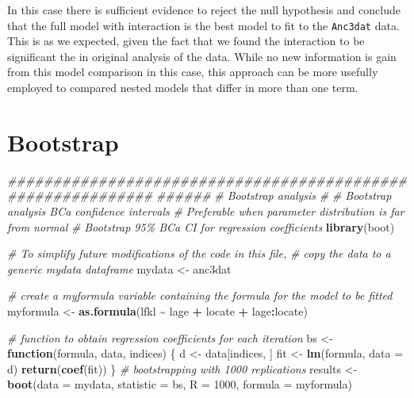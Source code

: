 \documentclass[
  12pt,
]{book}
\newenvironment{Shaded}{\begin{snugshade}}{\end{snugshade}}
\newcommand{\CommentTok}[1]{\textcolor[rgb]{0.56,0.35,0.01}{\textit{#1}}}
\newcommand{\ControlFlowTok}[1]{\textcolor[rgb]{0.13,0.29,0.53}{\textbf{#1}}}
\newcommand{\DataTypeTok}[1]{\textcolor[rgb]{0.13,0.29,0.53}{#1}}
\newcommand{\DecValTok}[1]{\textcolor[rgb]{0.00,0.00,0.81}{#1}}
\newcommand{\KeywordTok}[1]{\textcolor[rgb]{0.13,0.29,0.53}{\textbf{#1}}}
\newcommand{\NormalTok}[1]{#1}
\newcommand{\OperatorTok}[1]{\textcolor[rgb]{0.81,0.36,0.00}{\textbf{#1}}}
\newcommand{\StringTok}[1]{\textcolor[rgb]{0.31,0.60,0.02}{#1}}
\begin{document}
In this case there is sufficient evidence to reject the null hypothesis and conclude that the full model with interaction is the best model to fit to the \texttt{Anc3dat} data. This is as we expected, given the fact that we found the interaction to be significant the in original analysis of the data. While no new information is gain from this model comparison in this case, this approach can be more usefully employed to compared nested models that differ in more than one term.

\hypertarget{bootstrap-1}{%
\section{Bootstrap}\label{bootstrap-1}}

\begin{Shaded}
\begin{Highlighting}[]
\CommentTok{\#\#\#\#\#\#\#\#\#\#\#\#\#\#\#\#\#\#\#\#\#\#\#\#\#\#\#\#\#\#\#\#\#\#\#\#\#\#\#\#\#\#\#\#\#\#\#\#\#\#\#\#\#\#\#\#\#\#\#\#}
\CommentTok{\#\#\#\#\#\#}
\CommentTok{\# Bootstrap analysis}
\CommentTok{\#}
\CommentTok{\# Bootstrap analysis BCa confidence intervals}
\CommentTok{\# Preferable when parameter distribution is far from normal}
\CommentTok{\# Bootstrap 95\% BCa CI for regression coefficients}
\KeywordTok{library}\NormalTok{(boot)}

\CommentTok{\# To simplify future modifications of the code in this file,}
\CommentTok{\# copy the data to a generic mydata dataframe}
\NormalTok{mydata \textless{}{-}}\StringTok{ }\NormalTok{anc3dat}

\CommentTok{\# create a myformula variable containing the formula for the model to be fitted}
\NormalTok{myformula \textless{}{-}}\StringTok{ }\KeywordTok{as.formula}\NormalTok{(lfkl }\OperatorTok{\textasciitilde{}}\StringTok{ }\NormalTok{lage }\OperatorTok{+}\StringTok{ }\NormalTok{locate }\OperatorTok{+}\StringTok{ }\NormalTok{lage}\OperatorTok{:}\NormalTok{locate)}

\CommentTok{\# function to obtain regression coefficients for each iteration}
\NormalTok{bs \textless{}{-}}\StringTok{ }\ControlFlowTok{function}\NormalTok{(formula, data, indices) \{}
\NormalTok{  d \textless{}{-}}\StringTok{ }\NormalTok{data[indices, ]}
\NormalTok{  fit \textless{}{-}}\StringTok{ }\KeywordTok{lm}\NormalTok{(formula, }\DataTypeTok{data =}\NormalTok{ d)}
  \KeywordTok{return}\NormalTok{(}\KeywordTok{coef}\NormalTok{(fit))}
\NormalTok{\}}
\CommentTok{\# bootstrapping with 1000 replications}
\NormalTok{results \textless{}{-}}\StringTok{ }\KeywordTok{boot}\NormalTok{(}\DataTypeTok{data =}\NormalTok{ mydata, }\DataTypeTok{statistic =}\NormalTok{ bs, }\DataTypeTok{R =} \DecValTok{1000}\NormalTok{, }\DataTypeTok{formula =}\NormalTok{ myformula)}


\end{Highlighting}
\end{Shaded}
\end{document}
